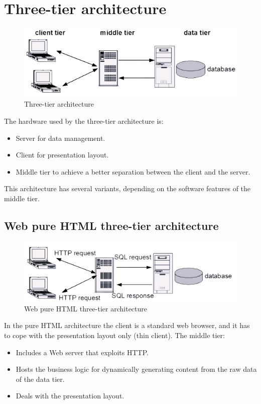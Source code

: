 \documentclass[12pt, a4paper]{report}
\newtheorem[style=M,bodystyle=\normalfont]{theorem}{Theorem}
\newtheorem[style=M,bodystyle=\normalfont]{corollary}{Corollary}
\newtheorem[style=M,bodystyle=\normalfont]{lemma}{Lemma}
\newtheorem[style=M,bodystyle=\normalfont]{definition}{Definition}
\begin{document}
    \section{Three-tier architecture}
    \begin{figure}[H]
        \centering
        \includegraphics[width=0.5\linewidth]{images/tt.png}
        \caption{Three-tier architecture}
    \end{figure}
    The hardware used by the three-tier architecture is: 
    \begin{itemize}
        \item Server for data management. 
        \item Client for presentation layout. 
        \item Middle tier to achieve a better separation between the client and the server. 
    \end{itemize}
    This architecture has several variants, depending on the software features of the middle tier. 
    
    \subsection{Web pure HTML three-tier architecture}
    \begin{figure}[H]
        \centering
        \includegraphics[width=0.5\linewidth]{images/ttph.png}
        \caption{Web pure HTML three-tier architecture}
    \end{figure}
    In the pure HTML architecture the client is a standard web browser, and it has to cope with the presentation layout only (thin client). The middle tier: 
    \begin{itemize}
        \item Includes a Web server that exploits HTTP.
        \item Hosts the business logic for dynamically generating content from the raw data of the data tier. 
        \item Deals with the presentation layout. 
    \end{itemize}
\end{document}
